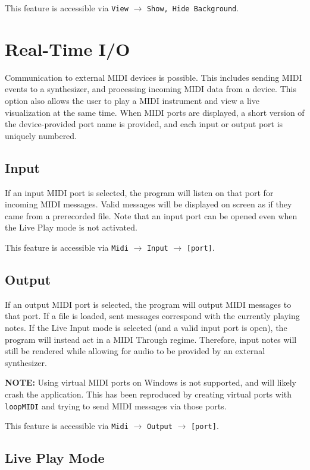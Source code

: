 \documentclass[english]{article}
\providecommand{\mi}[1]{\texttt{#1}}
\begin{document}
This feature is accessible via 
\mi{View} $\rightarrow$ \mi{{Show, Hide} Background}.

\section{Real-Time I/O}

Communication to external MIDI devices is possible. This includes sending MIDI events to a synthesizer,
and processing incoming MIDI data from a device. This option also allows the user to play a MIDI instrument and
view a live visualization at the same time. When MIDI ports are displayed, a short version of the device-provided
port name is provided, and each input or output port is uniquely numbered.

\subsection{Input}

If an input MIDI port is selected, the program will listen on that port for incoming MIDI messages. Valid messages will
be displayed on screen as if they came from a prerecorded file. Note that an input port can be opened even when the
Live Play mode is not activated.

This feature is accessible via 
\mi{Midi} $\rightarrow$ \mi{Input} $\rightarrow$ \mi{[port]}.

\subsection{Output}
\label{subsec:output}

If an output MIDI port is selected, the program will output MIDI messages to that port. If a file is loaded, sent messages
correspond with the currently playing notes. If the Live Input mode is selected (and a valid input port is open), the program
will instead act in a MIDI Through regime. Therefore, input notes will still 
be rendered while allowing for audio to be provided by an external synthesizer.

\textbf{NOTE:} Using virtual MIDI ports on Windows is not supported, and will likely crash the application. This has been
reproduced by creating virtual ports with \mi{loopMIDI} and trying to send MIDI messages via those ports.

This feature is accessible via 
\mi{Midi} $\rightarrow$ \mi{Output} $\rightarrow$ \mi{[port]}.

\subsection{Live Play Mode}
\label{subsec:liveplay}
\end{document}
